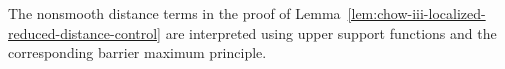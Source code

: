 \begin{remark}
\label{rem:chow-iii-localized-barrier-nonsmoothness}
The nonsmooth distance terms in the proof of
Lemma~\ref{lem:chow-iii-localized-reduced-distance-control} are interpreted
using upper support functions and the corresponding barrier maximum
principle.
\end{remark}
